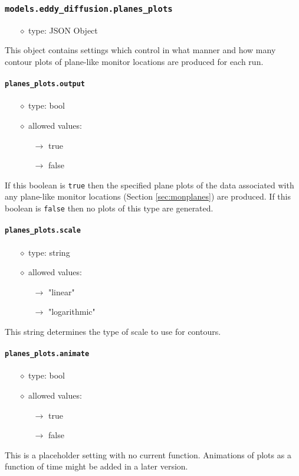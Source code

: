 \documentclass[]{article}
\def\code#1{\texttt{#1}}
\begin{document}
\subsubsection{\code{models.eddy\_diffusion.planes\_plots}}
\begin{itemize}
    \item[$\diamond$] type: JSON Object 
\end{itemize}
This object contains settings which control in what manner and how many contour 
plots of plane-like monitor locations are produced for each run. 

\paragraph{\code{planes\_plots.output}}
\begin{itemize}
    \item[$\diamond$] type: bool 
    \item[$\diamond$] allowed values:
    \begin{itemize}
        \item[$\rightarrow$] true
        \item[$\rightarrow$] false
    \end{itemize}
\end{itemize}
If this boolean is \code{true} then the specified plane plots of the data
associated with any plane-like monitor locations (Section \ref{sec:monplanes}) are
produced.  If this boolean is \code{false} then no plots of this type are
generated.

\paragraph{\code{planes\_plots.scale}}
\begin{itemize}
    \item[$\diamond$] type: string 
    \item[$\diamond$] allowed values:
    \begin{itemize}
        \item[$\rightarrow$] "linear"
        \item[$\rightarrow$] "logarithmic"
    \end{itemize}
\end{itemize}
This string determines the type of scale to use for contours.

\paragraph{\code{planes\_plots.animate}}
\begin{itemize}
    \item[$\diamond$] type: bool 
    \item[$\diamond$] allowed values:
    \begin{itemize}
        \item[$\rightarrow$] true
        \item[$\rightarrow$] false
    \end{itemize}
\end{itemize}
This is a placeholder setting with no current function. Animations of plots as
a function of time might be added in a later version.
\end{document}
